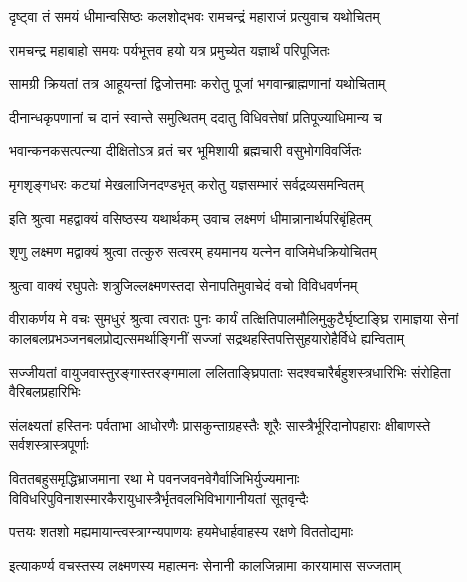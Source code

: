 \twolineshloka
{दृष्ट्वा तं समयं धीमान्वसिष्ठः कलशोद्भवः}
{रामचन्द्रं महाराजं प्रत्युवाच यथोचितम्}%


\twolineshloka
{रामचन्द्र महाबाहो समयः पर्यभूत्तव}
{हयो यत्र प्रमुच्येत यज्ञार्थं परिपूजितः}%

\twolineshloka
{सामग्री क्रियतां तत्र आहूयन्तां द्विजोत्तमाः}
{करोतु पूजां भगवान्ब्राह्मणानां यथोचिताम्}%

\twolineshloka
{दीनान्धकृपणानां च दानं स्वान्ते समुत्थितम्}
{ददातु विधिवत्तेषां प्रतिपूज्याधिमान्य च}%

\twolineshloka
{भवान्कनकसत्पत्न्या दीक्षितोऽत्र व्रतं चर}
{भूमिशायी ब्रह्मचारी वसुभोगविवर्जितः}%

\twolineshloka
{मृगशृङ्गधरः कट्यां मेखलाजिनदण्डभृत्}
{करोतु यज्ञसम्भारं सर्वद्रव्यसमन्वितम्}%

\twolineshloka
{इति श्रुत्वा महद्वाक्यं वसिष्ठस्य यथार्थकम्}
{उवाच लक्ष्मणं धीमान्नानार्थपरिबृंहितम्}%


\twolineshloka
{शृणु लक्ष्मण मद्वाक्यं श्रुत्वा तत्कुरु सत्वरम्}
{हयमानय यत्नेन वाजिमेधक्रियोचितम्}%


\twolineshloka
{श्रुत्वा वाक्यं रघुपतेः शत्रुजिल्लक्ष्मणस्तदा}
{सेनापतिमुवाचेदं वचो विविधवर्णनम्}%


\fourlineindentedshloka
{वीराकर्णय मे वचः सुमधुरं श्रुत्वा त्वरातः पुनः}
{कार्यं तत्क्षितिपालमौलिमुकुटैर्घृष्टाङ्घ्रि रामाज्ञया}
{सेनां कालबलप्रभञ्जनबलप्रोद्यत्समर्थाङ्गिनीं}
{सज्जां सद्रथहस्तिपत्तिसुहयारोहैर्विधे ह्यन्विताम्}%

\twolineshloka
{सज्जीयतां वायुजवास्तुरङ्गास्तरङ्गमाला ललिताङ्घ्रिपाताः}
{सदश्वचारैर्बहुशस्त्रधारिभिः संरोहिता वैरिबलप्रहारिभिः}%

\twolineshloka
{संलक्ष्यतां हस्तिनः पर्वताभा आधोरणैः प्रासकुन्ताग्रहस्तैः}
{शूरैः सास्त्रैर्भूरिदानोपहाराः क्षीबाणस्ते सर्वशस्त्रास्त्रपूर्णाः}%

\twolineshloka
{विततबहुसमृद्धिभ्राजमाना रथा मे पवनजवनवेगैर्वाजिभिर्युज्यमानाः}
{विविधरिपुविनाशस्मारकैरायुधास्त्रैर्भृतवलभिविभागानीयतां सूतवृन्दैः}%

\twolineshloka
{पत्तयः शतशो मह्यमायान्त्वस्त्राग्न्यपाणयः}
{हयमेधार्हवाहस्य रक्षणे विततोद्यमाः}%

\twolineshloka
{इत्याकर्ण्य वचस्तस्य लक्ष्मणस्य महात्मनः}
{सेनानी कालजिन्नामा कारयामास सज्जताम्}%

